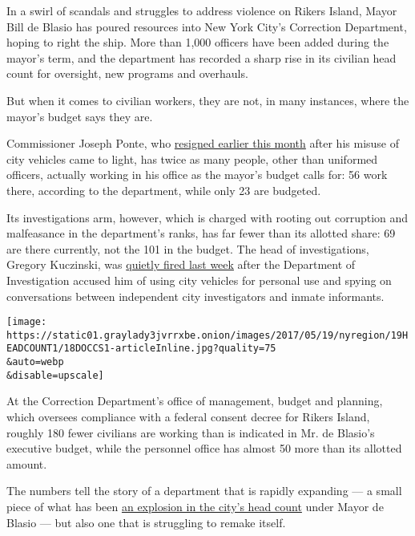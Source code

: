 In a swirl of scandals and struggles to address violence on Rikers
Island, Mayor Bill de Blasio has poured resources into New York City's
Correction Department, hoping to right the ship. More than 1,000
officers have been added during the mayor's term, and the department has
recorded a sharp rise in its civilian head count for oversight, new
programs and overhauls.

But when it comes to civilian workers, they are not, in many instances,
where the mayor's budget says they are.

Commissioner Joseph Ponte, who
\href{https://www.nytimes3xbfgragh.onion/2017/05/11/nyregion/bill-de-blasio-joseph-ponte-correction-commissioner.html}{resigned
earlier this month} after his misuse of city vehicles came to light, has
twice as many people, other than uniformed officers, actually working in
his office as the mayor's budget calls for: 56 work there, according to
the department, while only 23 are budgeted.

Its investigations arm, however, which is charged with rooting out
corruption and malfeasance in the department's ranks, has far fewer than
its allotted share: 69 are there currently, not the 101 in the budget.
The head of investigations, Gregory Kuczinski, was
\href{https://www.nytimes3xbfgragh.onion/2017/05/16/nyregion/amid-eavesdropping-accusations-city-jails-agency-official-is-fired.html?rref=collection\%2Fsectioncollection\%2Fnyregion\&action=click\&contentCollection=nyregion\&region=rank\&module=package\&version=highlights\&contentPlacement=2\&pgtype=sectionfront\&_r=0}{quietly
fired last week} after the Department of Investigation accused him of
using city vehicles for personal use and spying on conversations between
independent city investigators and inmate informants.

\texttt{[image: https://static01.graylady3jvrrxbe.onion/images/2017/05/19/nyregion/19HEADCOUNT1/18DOCCS1-articleInline.jpg?quality=75\\\&auto=webp\\\&disable=upscale]}

At the Correction Department's office of management, budget and
planning, which oversees compliance with a federal consent decree for
Rikers Island, roughly 180 fewer civilians are working than is indicated
in Mr. de Blasio's executive budget, while the personnel office has
almost 50 more than its allotted amount.

The numbers tell the story of a department that is rapidly expanding ---
a small piece of what has been
\href{https://www.nytimes3xbfgragh.onion/2016/10/12/nyregion/bill-de-blasio-government-jobs.html}{an
explosion in the city's head count} under Mayor de Blasio --- but also
one that is struggling to remake itself.

